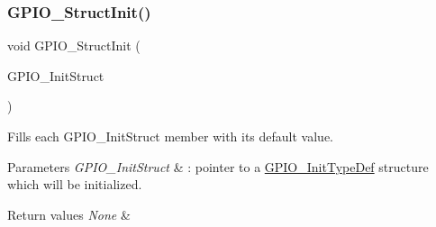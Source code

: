 \subsubsection{\texorpdfstring{G\+P\+I\+O\+\_\+\+Struct\+Init()}{GPIO\_StructInit()}}
{\footnotesize\ttfamily void G\+P\+I\+O\+\_\+\+Struct\+Init (\begin{DoxyParamCaption}\item[{\mbox{\hyperlink{struct_g_p_i_o___init_type_def}{G\+P\+I\+O\+\_\+\+Init\+Type\+Def}} $\ast$}]{G\+P\+I\+O\+\_\+\+Init\+Struct }\end{DoxyParamCaption})}



Fills each G\+P\+I\+O\+\_\+\+Init\+Struct member with its default value. 


\begin{DoxyParams}{Parameters}
{\em G\+P\+I\+O\+\_\+\+Init\+Struct} & \+: pointer to a \mbox{\hyperlink{struct_g_p_i_o___init_type_def}{G\+P\+I\+O\+\_\+\+Init\+Type\+Def}} structure which will be initialized. \\
\hline
\end{DoxyParams}

\begin{DoxyRetVals}{Return values}
{\em None} & \\
\hline
\end{DoxyRetVals}
